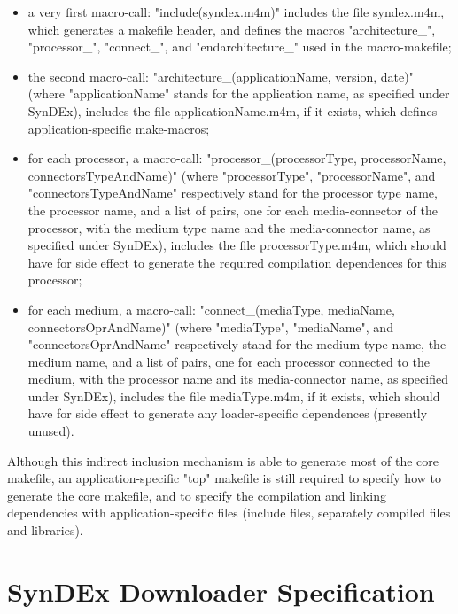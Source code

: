 \documentclass[11pt,twoside]{report}
\begin{document}
\begin{itemize}
\item a very first macro-call: "include(syndex.m4m)" includes the file
  syndex.m4m, which generates a makefile header, and defines the
  macros "architecture\_", "processor\_", "connect\_", and
  "endarchitecture\_" used in the macro-makefile;
\item the second macro-call: "architecture\_(applicationName, version,
  date)" (where "applicationName" stands for the application name, as
  specified under SynDEx), includes the file applicationName.m4m, if
  it exists, which defines application-specific make-macros;
\item for each processor, a macro-call: "processor\_(processorType,
  processorName, connectorsTypeAndName)" (where "processorType",
  "processorName", and "connectorsTypeAndName" respectively stand for
  the processor type name, the processor name, and a list of pairs,
  one for each media-connector of the processor, with the medium type
  name and the media-connector name, as specified under SynDEx),
  includes the file processorType.m4m, which should have for side
  effect to generate the required compilation dependences for this
  processor;
\item for each medium, a macro-call: "connect\_(mediaType, mediaName,
  connectorsOprAndName)" (where "mediaType", "mediaName", and
  "connectorsOprAndName" respectively stand for the medium type name,
  the medium name, and a list of pairs, one for each processor
  connected to the medium, with the processor name and its
  media-connector name, as specified under SynDEx), includes the file
  mediaType.m4m, if it exists, which should have for side effect to
  generate any loader-specific dependences (presently unused).
\end{itemize}
Although this indirect inclusion mechanism is able to generate most of
the core makefile, an application-specific "top" makefile is still
required to specify how to generate the core makefile, and to specify
the compilation and linking dependencies with application-specific
files (include files, separately compiled files and libraries).

\chapter{SynDEx Downloader Specification}
\label{downloader_specification}
\end{document}
